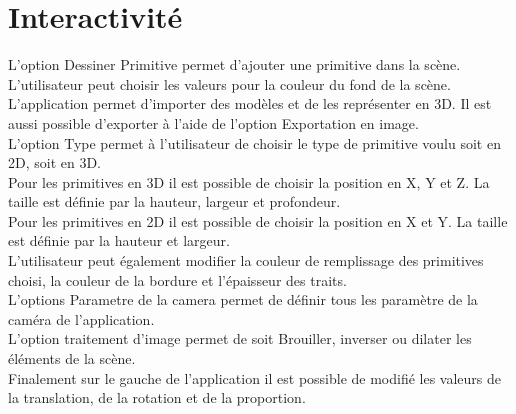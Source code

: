 \chapter{Interactivité}
\label{s:interactivite}

L’option Dessiner Primitive permet d’ajouter une primitive dans la scène. L’utilisateur peut choisir les valeurs pour la couleur du fond de la scène. \\
L’application permet d’importer des modèles et de les représenter en 3D. Il est aussi possible d’exporter à l’aide de l’option Exportation en image. \\
L’option Type permet à l’utilisateur de choisir le type de primitive voulu soit en 2D, soit en 3D. \\
Pour les primitives en 3D il est possible de choisir la position en X, Y et Z. La taille est définie par la hauteur, largeur et profondeur.\\
Pour les primitives en 2D il est possible de choisir la position en X et Y.  La taille est définie par la hauteur et largeur.\\
L’utilisateur peut également modifier la couleur de remplissage des primitives choisi, la couleur de la bordure et l’épaisseur des traits.\\ 
L’options Parametre de la camera permet de définir tous les paramètre de la caméra de l’application. \\
L’option traitement d’image permet de soit Brouiller, inverser ou dilater les éléments de la scène.  \\
Finalement sur le gauche de l’application il est possible de modifié les valeurs de la translation, de la rotation et de la proportion.\\
